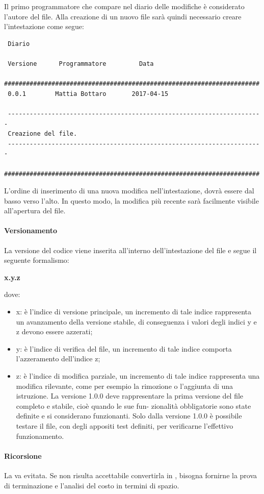  Il primo programmatore che compare nel diario delle modifiche è considerato l'autore del file. Alla creazione di un nuovo file sarà quindi necessario creare l'intestazione come segue:
 \begin{lstlisting}
 Diario
 
 Versione      Programmatore         Data
 ######################################################################
 0.0.1        Mattia Bottaro       2017-04-15
 
 ----------------------------------------------------------------------
 Creazione del file.
 ----------------------------------------------------------------------
 ######################################################################
 \end{lstlisting}
 
 L'ordine di inserimento di una nuova modifica nell'intestazione, dovrà essere dal basso verso l'alto. In questo modo, la modifica più recente sarà facilmente visibile all'apertura del file.
 \newpage
 \paragraph{Versionamento}
 La versione del codice viene inserita all’interno dell’intestazione del file e segue il seguente formalismo:\\
 \centerline{\textbf{x.y.z}} dove:
  \begin{itemize}
 	\item x: è l’indice di versione principale, un incremento di tale indice rappresenta un avanzamento
 	della versione stabile, di conseguenza i valori degli indici y e z devono essere azzerati;
 	\item y: è l’indice di verifica del file, un incremento di tale indice comporta l’azzeramento
 	dell’indice z;
 	\item z: è l’indice di modifica parziale, un incremento di tale indice rappresenta una modifica
 	rilevante, come per esempio la rimozione o l’aggiunta di una istruzione. La versione 1.0.0
 	deve rappresentare la prima versione del file completo e stabile, cioè quando le sue fun-
 	zionalità obbligatorie sono state definite e si considerano funzionanti. Solo dalla versione
 	1.0.0 è possibile testare il file, con degli appositi test definiti, per verificarne l’effettivo
 	funzionamento.
 \end{itemize}
 \paragraph{Ricorsione}
 La  va evitata. Se non risulta accettabile convertirla in , bisogna fornirne la prova di terminazione e l'analisi del costo in termini di spazio.

